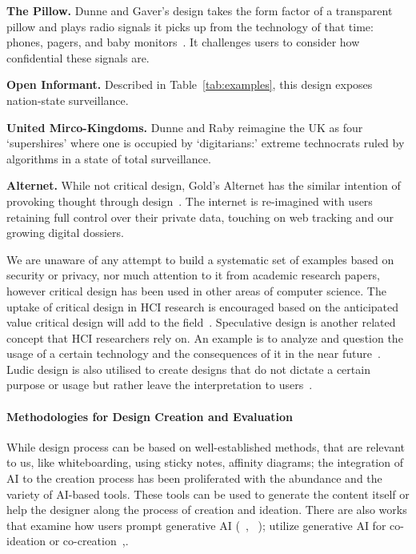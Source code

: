 \begin{compactlist}
\item \textbf{The Pillow.} Dunne and Gaver's design takes the form factor of a transparent pillow and plays radio signals it picks up from the technology of that time: \eg phones, pagers, and baby monitors~\cite{DuGa97}. It challenges users to consider how confidential these signals are.  
\item \textbf{Open Informant.} Described in Table~\ref{tab:examples}, this design exposes nation-state surveillance.
\item \textbf{United Mirco-Kingdoms.} Dunne and Raby reimagine the UK as four `supershires' where one is occupied by `digitarians:' extreme technocrats ruled by algorithms in a state of total surveillance.  
\item \textbf{Alternet.} While not critical design, Gold's Alternet has the similar intention of provoking thought through design~\cite{Gol14}. The internet is re-imagined with users retaining full control over their private data, touching on web tracking and our growing digital dossiers. 
\end{compactlist}

We are unaware of any attempt to build a systematic set of examples based on security or privacy, nor much attention to it from academic research papers, however critical design has been used in other areas of computer science. The uptake of critical design in HCI research is encouraged based on the anticipated value critical design will add to the field~\cite{bardzell_what_2013}. Speculative design is another related concept that HCI researchers rely on. An example is to analyze and question the usage of a certain technology and the consequences of it in the near future~\cite{lawson_problematising_2015}. Ludic design is also utilised to create designs that do not dictate a certain purpose or usage but rather leave the interpretation to users~\cite{gaver_drift_2004}.

\paragraph{Methodologies for Design Creation and Evaluation} 
While design process can be based on well-established methods, that are relevant to us, like whiteboarding, using sticky notes, affinity diagrams; the integration of AI to the creation process has been proliferated with the abundance and the variety of AI-based tools. These tools can be used to generate the content itself or help the designer along the process of creation and ideation. There are also works that examine how users prompt generative AI (~\cite{sanchez_examining_2023}, ~\cite{chang_prompt_2023}); utilize generative AI for co-ideation or co-creation~\cite{tholander_design_2023},\cite{chiou_designing_2023}.

